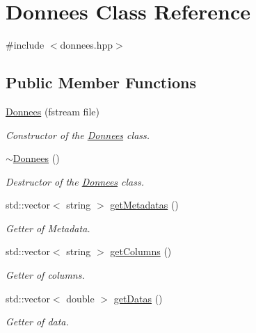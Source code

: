 \hypertarget{classDonnees}{}\section{Donnees Class Reference}
\label{classDonnees}


{\ttfamily \#include $<$donnees.\+hpp$>$}

\subsection*{Public Member Functions}
\begin{DoxyCompactItemize}
\item 
\hyperlink{classDonnees_a29a0763f255154038b260dccb7b024d5}{Donnees} (fstream file)
\begin{DoxyCompactList}\small\item\em Constructor of the \hyperlink{classDonnees}{Donnees} class. \end{DoxyCompactList}\item 
\hypertarget{classDonnees_a32538936d4181628ec1cc7f6533436d0}{}\label{classDonnees_a32538936d4181628ec1cc7f6533436d0} 
\hyperlink{classDonnees_a32538936d4181628ec1cc7f6533436d0}{$\sim$\+Donnees} ()
\begin{DoxyCompactList}\small\item\em Destructor of the \hyperlink{classDonnees}{Donnees} class. \end{DoxyCompactList}\item 
std\+::vector$<$ string $>$ \hyperlink{classDonnees_a90424f557bd469396ea30c13ed08730e}{get\+Metadatas} ()
\begin{DoxyCompactList}\small\item\em Getter of Metadata. \end{DoxyCompactList}\item 
std\+::vector$<$ string $>$ \hyperlink{classDonnees_a14bd2cef1e2356f8c9dfbb768ccd8da2}{get\+Columns} ()
\begin{DoxyCompactList}\small\item\em Getter of columns. \end{DoxyCompactList}\item 
std\+::vector$<$ double $>$ \hyperlink{classDonnees_a99d5a923035f15d8fbd8c8a519cf5848}{get\+Datas} ()
\begin{DoxyCompactList}\small\item\em Getter of data. \end{DoxyCompactList}\item 

\end{DoxyCompactItemize}

